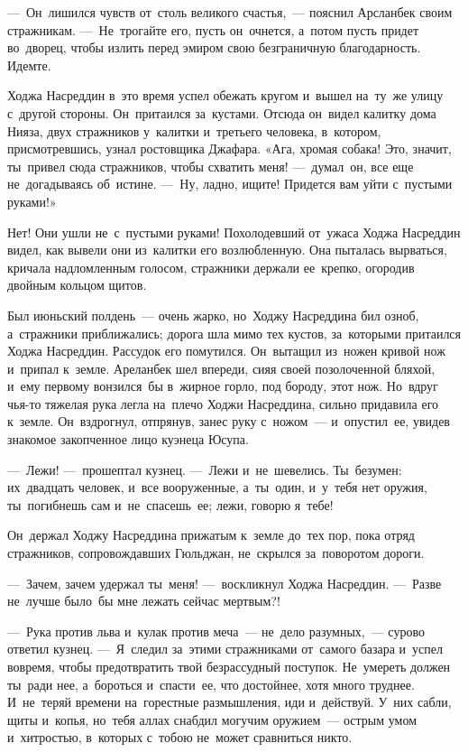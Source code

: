 \documentclass[12pt,a4paper]{book}
\begin{document}
—~Он~лишился чувств от~столь великого счастья,~— пояснил Арсланбек своим стражникам. —~Не~трогайте его, пусть он~очнется, а~потом пусть придет во~дворец, чтобы излить перед эмиром свою безграничную благодарность. Идемте.

Ходжа Насреддин в~это время успел обежать кругом и~вышел на~ту~же улицу с~другой стороны. Он~притаился за~кустами. Отсюда он~видел калитку дома Нияза, двух стражников у~калитки и~третьего человека, в~котором, присмотревшись, узнал ростовщика Джафара. «Ага, хромая собака! Это, значит, ты~привел сюда стражников, чтобы схватить меня! —~думал~он, все еще не~догадываясь об~истине. —~Ну, ладно, ищите! Придется вам уйти с~пустыми руками!»

Нет! Они ушли не~с~пустыми руками! Похолодевший от~ужаса Ходжа Насреддин видел, как вывели они из~калитки его возлюбленную. Она пыталась вырваться, кричала надломленным голосом, стражники держали ее~крепко, огородив двойным кольцом щитов.

Был июньский полдень~— очень жарко, но~Ходжу Насреддина бил озноб, а~стражники приближались; дорога шла мимо тех кустов, за~которыми притаился Ходжа Насреддин. Рассудок его помутился. Он~вытащил из~ножен кривой нож и~припал к~земле. Ареланбек шел впереди, сияя своей позолоченной бляхой, и~ему первому вонзился~бы в~жирное горло, под бороду, этот нож. Но~вдруг чья-то тяжелая рука легла на~плечо Ходжи Насреддина, сильно придавила его к~земле. Он~вздрогнул, отпрянув, занес руку с~ножом~— и~опустил~ее, увидев знакомое закопченное лицо куэнеца Юсупа.

—~Лежи! —~прошептал кузнец. —~Лежи и~не~шевелись. Ты~безумен: их~двадцать человек, и~все вооруженные, а~ты~один, и~у~тебя нет оружия, ты~погибнешь сам и~не~спасешь~ее; лежи, говорю я~тебе!

Он~держал Ходжу Насреддина прижатым к~земле до~тех пор, пока отряд стражников, сопровождавших Гюльджан, не~скрылся за~поворотом дороги.

—~Зачем, зачем удержал ты~меня! —~воскликнул Ходжа Насреддин. —~Разве не~лучше было~бы мне лежать сейчас мертвым?!

—~Рука против льва и~кулак против меча~— не~дело разумных,~— сурово ответил кузнец. —~Я~следил за~этими стражниками от~самого базара и~успел вовремя, чтобы предотвратить твой безрассудный поступок. Не~умереть должен ты~ради нее, а~бороться и~спасти~ее, что достойнее, хотя много труднее. И~не~теряй времени на~горестные размышления, иди и~действуй. У~них сабли, щиты и~копья, но~тебя аллах снабдил могучим оружием~— острым умом и~хитростью, в~которых с~тобою не~может сравниться никто.
\end{document}
